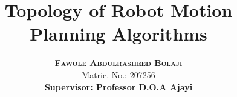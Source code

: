 \newcommand{\ra}{\rightarrow} %
\newcommand{\lra}{\longrightarrow}  %
\newcommand{\disp}{\displaystyle} %
\newcommand{\QQ}{\mathbb{Q}} %
\newcommand{\NN}{\mathbb{N}} %
\newcommand{\CC}{\mathbb{C}} %
\newcommand{\PP}{\mathbb{P}} %
\newcommand{\RR}{\mathbb{R}} %
\newcommand{\Sb}{\mathbb{S}}
\newcommand{\htp}[1]{\underset{#1}{\simeq}} %
\newcommand{\ZZ}{\mathbb{Z}}
\newcommand{\TT}{\mathbb{T}}
\newcommand{\KK}{\mathbb{K}}
\newcommand{\zdcl}{L_{dc}} %
\newcommand{\tcomp}{\textsf{TC}} %
\newcommand{\ltcomp}{\textsf{TC}^{LP}} %
\newcommand{\abs}[1]{\lvert#1\rvert} %


\DeclareMathOperator{\rel}{rel}
\DeclareMathOperator{\map}{map}
\DeclareMathOperator{\cat}{cat}

\renewcommand{\bibname}{References}




\title{Topology of Robot Motion Planning Algorithms}
\author{\textbf{\textsc{Fawole Abdulrasheed Bolaji}} \\ Matric. No.: 207256 \\[.35cm] \textbf{Supervisor: Professor D.O.A Ajayi} \\ }
